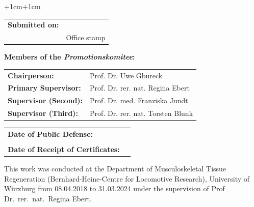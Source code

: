 \begin{adjustwidth}{+1cm}{+1cm} %

    \noindent
    \begin{tabular}{l l}
        \textbf{Submitted on:} & \dotuline{\hspace{10cm}} \\
                               & {\small Office stamp}    \\
    \end{tabular}


    \vspace{\vdouble}
    {\noindent\large \textbf{Members of the \textit{Promotionskomitee}:}}

    \vspace{\vhalf}
    \begin{tabular}{l l}
        \textbf{Chairperson:}         & Prof. Dr. Uwe Gbureck                \\
        \textbf{Primary Supervisor:}  & Prof. Dr. rer. nat. Regina Ebert  \\
        \textbf{Supervisor (Second):} & Prof. Dr. med. Franziska Jundt    \\
        \textbf{Supervisor (Third):}  & Prof. Dr. rer. nat. Torsten Blunk \\
    \end{tabular}


    \vspace{\vdouble}
    \noindent
    \begin{tabular}{l l}
        \textbf{Date of Public Defense:}          & \dotuline{\hspace{6.45cm}} \\
                                                  &                            \\
        \textbf{Date of Receipt of Certificates:} & \dotuline{\hspace{6.45cm}} \\
    \end{tabular}

\end{adjustwidth}

\thispagestyle{empty} %


\newpage


\vspace*{\fill} %
\noindent
This work was conducted at the Department of Musculoskeletal Tissue
Regeneration (Bernhard-Heine-Centre for Locomotive Research), University
of Würzburg from 08.04.2018 to 31.03.2024 under the supervision of
Prof Dr.~rer.~nat.~Regina Ebert.

\thispagestyle{empty} %